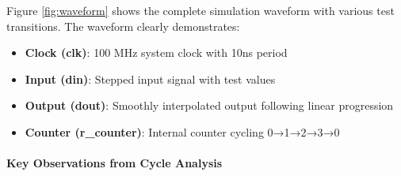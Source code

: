 \documentclass[a4paper,11pt]{article}
\begin{document}
Figure \ref{fig:waveform} shows the complete simulation waveform with various test transitions. The waveform clearly demonstrates:
\begin{itemize}
    \item \textbf{Clock (clk)}: 100 MHz system clock with 10ns period
    \item \textbf{Input (din)}: Stepped input signal with test values
    \item \textbf{Output (dout)}: Smoothly interpolated output following linear progression
    \item \textbf{Counter (r\_counter)}: Internal counter cycling 0→1→2→3→0
\end{itemize}



\paragraph{Key Observations from Cycle Analysis}
\end{document}

